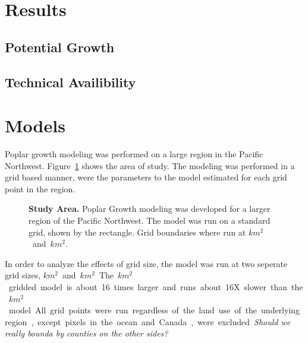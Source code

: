 \documentclass[10pt]{article}
\begin{document}
\section*{Results}
\subsection*{Potential Growth}
\subsection*{Technical Availibility}



\section*{Models}

Poplar growth modeling was performed on a large region in the Pacific
Northwest.  Figure~\ref{fig:study-area} shows the area of study.  The
modeling was performed in a grid based manner, were the parameters to
the model estimated for each grid point in the region.  

\begin{figure}[!ht]
\begin{center}
\vspace*{4cm}
\end{center}
\caption{ {\bf Study Area.}  Poplar Growth modeling was developed for
  a larger region of the Pacific Northwest.  The model was run on a
  standard grid, shown by the rectangle. Grid boundaries where run at
  \unit[2]{$km^2$} and \unit[8]{$km^2$}.  }
\label{fig:study-area}
\end{figure}

In order to analyze the effects of grid size, the model was run at two
seperate grid sizes, \unit[2]{$km^2$} and \unit[8]{$km^2$}.  The
\unit[2]{$km^2$} gridded model is about 16 times larger and runs about
16X slower than the \unit[8]{$km^2$} model.  

All grid points were run regardless of the land use of the underlying
region, except pixels in the ocean and Canada, were excluded.
\emph{Should we really bounda by counties on the other sides? }
\end{document}
